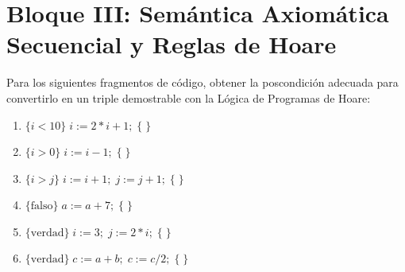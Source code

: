 \section{Bloque III: Semántica Axiomática Secuencial y Reglas de Hoare}

\begin{ejercicio}
Para los siguientes fragmentos de código, obtener la poscondición adecuada para convertirlo en un triple demostrable con la Lógica de Programas de Hoare:
\begin{enumerate}[label=(\alph*),leftmargin=*]
    \item $\{i < 10\} \; i := 2 * i + 1; \; \{ \; \}$
    \item $\{i > 0\} \; i := i - 1; \; \{ \; \}$
    \item $\{i > j\} \; i := i + 1; \; j := j + 1; \; \{ \; \}$
    \item $\{\text{falso}\} \; a := a + 7; \; \{ \; \}$
    \item $\{\text{verdad}\} \; i := 3; \; j := 2 * i; \; \{ \; \}$
    \item $\{\text{verdad}\} \; c := a + b; \; c := c / 2; \; \{ \; \}$
\end{enumerate}
\end{ejercicio}

